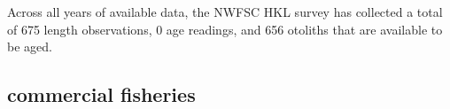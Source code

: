 \documentclass[11pt,
  english,
  letterpaper,
]{article}
\begin{document}

Across all years of available data, the NWFSC HKL survey has collected a total of 675 length observations, 0 age readings, and 656 otoliths that are available to be aged.

\leavevmode\tagmcend\tagstructend\par


\hypertarget{commercial-fisheries-6}{%
\subsection{commercial fisheries}\label{commercial-fisheries-6}}

\leavevmode\tagmcend\tagstructend


\begingroup\fontsize{10}{12}\selectfont \begingroup\fontsize{10}{12}\selectfont

\leavevmode\tagmcend\tagstructend\par
\end{document}
